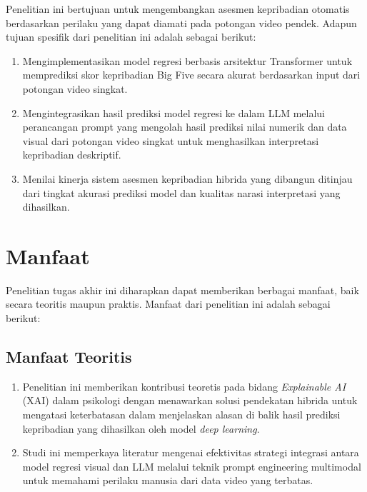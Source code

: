 Penelitian ini bertujuan untuk mengembangkan asesmen kepribadian otomatis berdasarkan perilaku yang dapat diamati pada potongan video pendek. Adapun tujuan spesifik dari penelitian ini adalah sebagai berikut:

\begin{enumerate}[nosep]
	\item Mengimplementasikan model regresi berbasis arsitektur Transformer untuk memprediksi skor kepribadian Big Five secara akurat berdasarkan input dari potongan video singkat.

	\item Mengintegrasikan hasil prediksi model regresi ke dalam LLM melalui perancangan prompt yang mengolah hasil prediksi nilai numerik dan data visual dari potongan video singkat untuk menghasilkan interpretasi kepribadian deskriptif.

	\item Menilai kinerja sistem asesmen kepribadian hibrida yang dibangun ditinjau dari tingkat akurasi prediksi model dan kualitas narasi interpretasi yang dihasilkan.
\end{enumerate}

\section{Manfaat}
\label{sec:manfaat}

Penelitian tugas akhir ini diharapkan dapat memberikan berbagai manfaat, baik secara teoritis maupun praktis. Manfaat dari penelitian ini adalah sebagai berikut:

\subsection{Manfaat Teoritis}
\begin{enumerate}[nosep]
	\item Penelitian ini memberikan kontribusi teoretis pada bidang \textit{Explainable AI} (XAI) dalam psikologi dengan menawarkan solusi pendekatan hibrida untuk mengatasi keterbatasan dalam menjelaskan alasan di balik hasil prediksi kepribadian yang dihasilkan oleh model \textit{deep learning}.

	\item Studi ini memperkaya literatur mengenai efektivitas strategi integrasi antara model regresi visual dan LLM melalui teknik prompt engineering multimodal untuk memahami perilaku manusia dari data video yang terbatas.
\end{enumerate}

